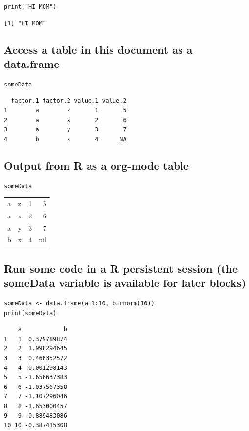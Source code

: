 \documentclass[11pt]{article}
\begin{document}
\begin{verbatim}
print("HI MOM")
\end{verbatim}

\begin{verbatim}
[1] "HI MOM"
\end{verbatim}

\subsection{Access a table in this document as a data.frame}
\label{sec:org09ef2fc}

\begin{verbatim}
someData
\end{verbatim}

\begin{verbatim}
  factor.1 factor.2 value.1 value.2
1        a        z       1       5
2        a        x       2       6
3        a        y       3       7
4        b        x       4      NA
\end{verbatim}

\subsection{Output from R as a org-mode table}
\label{sec:org7b70929}

\begin{verbatim}
someData
\end{verbatim}

\begin{center}
\begin{tabular}{llrr}
a & z & 1 & 5\\
a & x & 2 & 6\\
a & y & 3 & 7\\
b & x & 4 & nil\\
\end{tabular}
\end{center}

\subsection{Run some code in a R persistent session (the someData variable is available for later blocks)}
\label{sec:orgfeced25}
\begin{verbatim}
someData <- data.frame(a=1:10, b=rnorm(10))
print(someData)
\end{verbatim}

\begin{verbatim}
    a            b
1   1  0.379789874
2   2  1.998294645
3   3  0.466352572
4   4  0.001298143
5   5 -1.656637383
6   6 -1.037567358
7   7 -1.107296046
8   8 -1.653000457
9   9 -0.889483086
10 10 -0.387415308
\end{verbatim}
\end{document}
